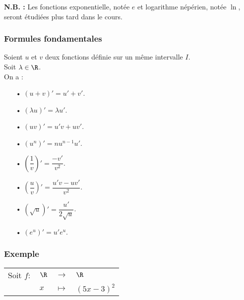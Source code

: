 \vspace*{.3cm}

\textbf{N.B. :} Les fonctions exponentielle, notée $e$ et logarithme népérien, notée $\ln$, seront étudiées plus tard dans le cours.

\newpage

\subsubsection{Formules fondamentales}

Soient $u$ et $v$ deux fonctions définie sur un même intervalle $I$. \\ Soit $\lambda \in \R$. \\

On a :  \\

\begin{itemize}
\item[•] $\left(u + v\right)' = u' + v'$. \\
\item[•] $\left(\lambda u\right)' = \lambda u'$. \\ 
\item[•] $\left(uv\right)' = u'v + uv'$.  \\
\item[•] $\left(u^n\right)' = nu^{n-1}u'$. \\
\item[•] $\left(\dfrac{1}{v}\right)' = \dfrac{-v'}{v^2}$. \\
\item[•] $\left(\dfrac{u}{v}\right)' = \dfrac{u'v - uv'}{v^2}$. \\
\item[•] $\left(\sqrt{u}\right)' = \dfrac{u'}{2\sqrt{u}}$. \\
\item[•] $\left(e^u\right)' = u'e^u$.
\end{itemize}

\subsubsection{Exemple}

\begin{tabular}{llll}
Soit $f:$ & $\R$ & $\longrightarrow$ & $\R$ \\
& $x$ & $\longmapsto$ & $\left(5x - 3\right)^2$ \\
\end{tabular}

\vspace*{.5cm}


